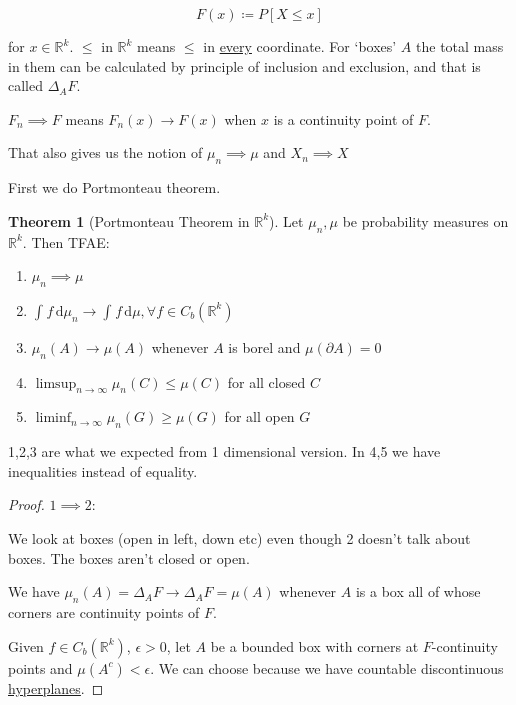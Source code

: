\documentclass{article}
\theoremstyle{definition}
\newtheorem{theorem}{Theorem}
\begin{document}
\[
    F(x)\coloneqq P[X \leq x]
\]

for \(x\in \mathbb{R} ^k\). \(\leq\) in \(\mathbb{R}^k\) means \(\leq\) in \underline{every} coordinate. For `boxes' \(A\) the total mass in them can be calculated by principle of inclusion and exclusion, and that is called \(\Delta_A F\).

\(F_n \implies F\) means \(F_n(x) \to F(x)\) when \(x\) is a continuity point of \(F\).

That also gives us the notion of \(\mu_n \implies \mu \) and \(X_n \implies X\) 

First we do Portmonteau theorem.

\begin{theorem}
    [Portmonteau Theorem in \(\mathbb{R}^k\)]

    Let \(\mu_n,\mu\) be probability measures on \(\mathbb{R}^k\). Then TFAE:

    \begin{enumerate}
        \item \(\mu_n \implies \mu \) 
        \item \(\int_{}^{} f \,\mathrm{d}\mu_n \to \int_{}^{} f \,\mathrm{d}\mu,\forall f\in C_b(\mathbb{R}^k)  \) 
        \item \(\mu _n(A) \to \mu (A)\) whenever \(A\) is borel and \(\mu (\partial A) = 0\) 
        \item \(\limsup_{n \to \infty} \mu _n(C) \leq \mu (C)\) for all closed \(C\) 
        \item \(\liminf_{n \to \infty} \mu _n(G)\geq \mu (G)\) for all open \(G\)
    \end{enumerate}
\end{theorem}

1,2,3 are what we expected from 1 dimensional version. In 4,5 we have inequalities instead of equality.

\begin{proof}
    \(1 \implies 2\):

    We look at boxes (open in left, down etc) even though 2 doesn't talk about boxes. The boxes aren't closed or open.

    We have \(\mu_n(A) = \Delta_A F \to \Delta_A F = \mu(A)\) whenever \(A\) is a box all of whose corners are continuity points of \(F\).
    
    Given \(f\in C_b(\mathbb{R}^k)\), \(\epsilon > 0\), let \(A\) be a bounded box with corners at \(F\)-continuity points and \(\mu (A^c) < \epsilon\). We can choose because we have countable discontinuous \underline{hyperplanes}.
\end{proof}
\end{document}
